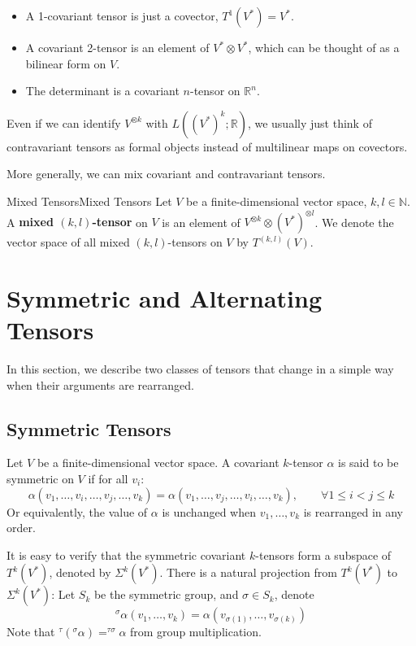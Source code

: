 \documentclass[../main.tex]{subfiles}
\begin{document}
\begin{itemize}
  \item A 1-covariant tensor is just a covector, $T^1(V^*) = V^*$.
  \item A covariant 2-tensor is an element of $V^* \otimes V^*$, which can be thought of as a bilinear form on $V$.
  \item The determinant is a covariant $n$-tensor on $\mathbb{R}^n$.
\end{itemize}

\begin{remark}
  Even if we can identify $V^{\otimes k}$ with $L((V^*)^k; \mathbb{R})$, we usually just think of contravariant tensors as formal objects instead of multilinear maps on covectors.
\end{remark}

More generally, we can mix covariant and contravariant tensors.

\begin{definition}{Mixed Tensors}{Mixed Tensors}
  Let $V$ be a finite-dimensional vector space, $k, l \in \mathbb{N}$. A \textbf{mixed $(k, l)$-tensor} on $V$ is an element of $V^{\otimes k} \otimes (V^*)^{\otimes l}$. We denote the vector space of all mixed $(k, l)$-tensors on $V$ by $T^{(k,l)}(V)$.
\end{definition}

\section{Symmetric and Alternating Tensors}
In this section, we describe two classes of tensors that change in a simple way when their arguments are rearranged.

\subsection{Symmetric Tensors}
Let $V$ be a finite-dimensional vector space. A covariant $k$-tensor $\alpha$ is said to be symmetric on $V$ if for all $v_i$:
\begin{equation}
  \alpha(v_1, \ldots ,v_i, \ldots ,v_j, \ldots ,v_k) = \alpha(v_1, \ldots ,v_j, \ldots ,v_i, \ldots ,v_k), \qquad \forall 1\leq i< j\leq k
\end{equation}
Or equivalently, the value of $\alpha$ is unchanged when $v_1, \ldots ,v_k$ is rearranged in any order.

It is easy to verify that the symmetric covariant $k$-tensors form a subspace of $T^k(V^*)$, denoted by $\Sigma^k(V^*)$. There is a natural projection from $T^k(V^*)$ to $\Sigma^k(V^*)$: Let $S_k$ be the symmetric group, and $\sigma\in S_k$, denote
\begin{equation*}
  ^\sigma \alpha(v_1, \ldots ,v_k) = \alpha(v_{\sigma(1)}, \ldots ,v_{\sigma(k)})
\end{equation*}
Note that $^\tau(^\sigma \alpha) = ^{\tau \sigma} \alpha$ from group multiplication.
\end{document}
